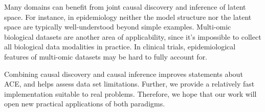 \documentclass[letterpaper]{article}
\begin{document}
Many domains can benefit from joint causal discovery and inference of latent space.  For instance, in epidemiology neither the model structure nor the latent space are typically well-understood beyond simple examples.  Multi-omic biological datasets are another area of applicability, since it's impossible to collect all biological data modalities in practice.  In clinical trials, epidemiological features of multi-omic datasets may be hard to fully account for.  

Combining causal discovery and causal inference improves statements about ACE, and helps assess data set limitations.  Further, we provide a relatively fast implementation suitable to real problems.  Therefore, we hope that our work will open new practical applications of both paradigms.
 
\small

\end{document}
